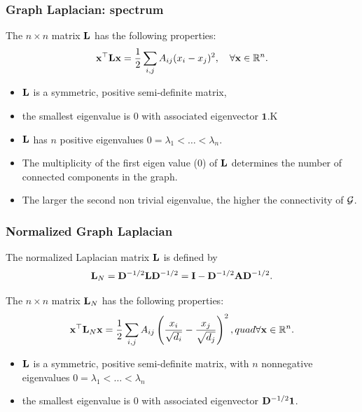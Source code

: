 \documentclass{beamer}\usepackage[]{graphicx}\usepackage[]{color}
\begin{document}
\begin{frame}
  \frametitle{Graph Laplacian: spectrum}

  \begin{proposition}[Spectrum of $\bL$]
    The $n\times n$ matrix $\bL$ has the following properties:
    \[
      \mathbf{x}^\top \mathbf{L} \mathbf{x} = \frac{1}{2} \sum_{i,j} A_{ij} (x_i - x_j)^2, \quad \forall \mathbf{x}\in\mathbb{R}^n .
    \]
    \vspace{-.25cm}
    \begin{itemize}
      \item $\bL$ is a symmetric, positive semi-definite matrix,
      \item  the smallest eigenvalue is $0$ with associated eigenvector $\mathbf{1}$.K
      \item $\bL$ has $n$ positive eigenvalues $0=\lambda_1<\dots <\lambda_n$. 
    \end{itemize}  
  \end{proposition}

  \begin{corollary}
    \vspace{-.25cm}
    \begin{itemize}
      \item The multiplicity of the first eigen value ($0$) of $\bL$ determines the number of connected components in the graph.
      \item The larger the second non trivial eigenvalue, the higher the connectivity of $\mathcal{G}$.
    \end{itemize}  
  \end{corollary}

\end{frame}

\begin{frame}
  \frametitle{Normalized Graph Laplacian}

  \begin{definition}
    The normalized Laplacian matrix $\bL$ is defined by 
    \[
      \mathbf{L}_N = \mathbf{D}^{-1/2}\mathbf{L}\mathbf{D}^{-1/2} = \mathbf{I} - \mathbf{D}^{-1/2} \mathbf{A} \mathbf{D}^{-1/2}.
    \]
  \end{definition}

  \begin{proposition}
    The $n\times n$ matrix $\mathbf{L}_N$ has the following properties:
      \[
        \mathbf{x}^\top \mathbf{L}_N \mathbf{x} = \frac{1}{2} \sum_{i,j} A_{ij}\left(\frac{x_i}{\sqrt{d_i}} - \frac{x_j}{\sqrt{d_j}} \right)^2, quad\forall\mathbf{x}\in\mathbb{R}^n.
      \]
    \vspace{-.25cm}
    \begin{itemize}
      \item $\bL$ is a symmetric, positive semi-definite matrix, with $n$ nonnegative eigenvalues $0=\lambda_1<\dots <\lambda_n$
      \item  the smallest eigenvalue is $0$ with associated eigenvector $\mathbf{D}^{-1/2}\mathbf{1}$.
    \end{itemize}  
  \end{proposition}

\end{frame}
\end{document}
